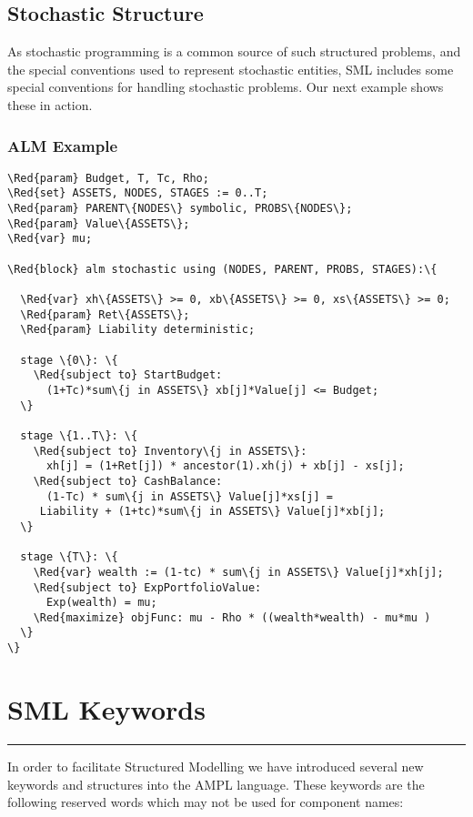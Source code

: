 \documentclass[10pt,a4paper]{book}
\begin{document}
\section{Stochastic Structure}

As stochastic programming is a common source of such structured problems, and
the special conventions used to represent stochastic entities, SML includes
some special conventions for handling stochastic problems. Our next example
shows these in action.

\subsection{ALM Example}

\begin{Verbatim}[frame=single,framerule=0.2pt,framesep=5pt,commandchars=\\\{\}]
\Red{param} Budget, T, Tc, Rho;
\Red{set} ASSETS, NODES, STAGES := 0..T;
\Red{param} PARENT\{NODES\} symbolic, PROBS\{NODES\};
\Red{param} Value\{ASSETS\};
\Red{var} mu;

\Red{block} alm stochastic using (NODES, PARENT, PROBS, STAGES):\{

  \Red{var} xh\{ASSETS\} >= 0, xb\{ASSETS\} >= 0, xs\{ASSETS\} >= 0;
  \Red{param} Ret\{ASSETS\};
  \Red{param} Liability deterministic;

  stage \{0\}: \{
    \Red{subject to} StartBudget:
      (1+Tc)*sum\{j in ASSETS\} xb[j]*Value[j] <= Budget;
  \}

  stage \{1..T\}: \{
    \Red{subject to} Inventory\{j in ASSETS\}:
      xh[j] = (1+Ret[j]) * ancestor(1).xh(j) + xb[j] - xs[j];
    \Red{subject to} CashBalance:
      (1-Tc) * sum\{j in ASSETS\} Value[j]*xs[j] = 
	 Liability + (1+tc)*sum\{j in ASSETS\} Value[j]*xb[j];
  \}

  stage \{T\}: \{
    \Red{var} wealth := (1-tc) * sum\{j in ASSETS\} Value[j]*xh[j];
    \Red{subject to} ExpPortfolioValue:
      Exp(wealth) = mu;
    \Red{maximize} objFunc: mu - Rho * ((wealth*wealth) - mu*mu )
  \}
\}
\end{Verbatim}

\chapter{SML Keywords}
\vspace{-0.6cm}\rule{\textwidth}{0.4ex}\vspace{0.1cm}
In order to facilitate Structured Modelling we have introduced several new
keywords and structures into the AMPL language. These keywords are the
following reserved words which may not be used for component names:
\end{document}
